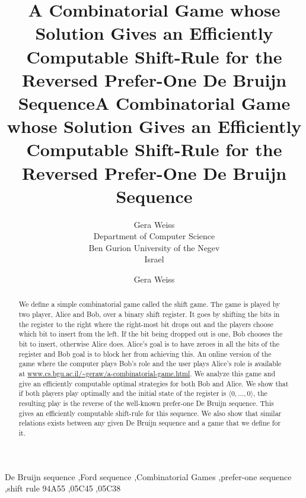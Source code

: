 \documentclass[final,12pt]{elsarticle}
\title{A Combinatorial Game whose Solution Gives an Efficiently Computable Shift-Rule for the Reversed Prefer-One De Bruijn Sequence}
\author{Gera Weiss\\ Department of Computer Science \\ Ben Gurion University of the Negev\\ Israel }
\theoremstyle{definition} \newtheorem{definition}[theorem]{Definition} \newtheorem{observation}[theorem]{Observation} \newtheorem{example}[theorem]{Example} \newtheorem{remark}[theorem]{Remark} \newtheorem{corrolary}[theorem]{Corrolary}
\newcommand{\T}[1]{\langle{#1}\rangle} \DeclareMathOperator{\drop}{drop} \DeclareMathOperator{\dropbits}{drop\_bits} \DeclareMathOperator{\dropstates}{drop\_states} \DeclareMathOperator{\leadingForm}{LeadingForm} \DeclareMathOperator{\dv}{div} %
\begin{document}


\sloppy
{}
\begin{frontmatter}
	
	\title{A Combinatorial Game whose Solution Gives an Efficiently Computable Shift-Rule for the Reversed Prefer-One De Bruijn Sequence} %
	
	
	\author[cs]{Gera Weiss}
	
	\address[cs]{Department of Computer Science, Ben-Gurion University of The Negev} 
	
	\begin{abstract}
		We define a simple combinatorial game called the shift game. The game is played by two player, Alice and Bob, over a binary shift register. It goes by shifting the bits in the register to the right where the right-most bit drops out and the players choose which bit to insert from the left. If the bit being dropped out is one, Bob chooses the bit to insert, otherwise Alice does. Alice's goal is to have zeroes in all the bits of the register and Bob goal is to block her from achieving this. An online version of the game where the computer plays Bob's role and the user plays Alice's role is available at \url{www.cs.bgu.ac.il/~geraw/a-combinatorial-game.html}. We analyze this game and give an efficiently computable optimal strategies for both Bob and Alice. We show that if both players play optimally and the initial state of the register is $\T{0,\dots,0}$, the resulting play is the reverse of the well-known prefer-one De Bruijn sequence. This gives an efficiently computable shift-rule for this sequence. We also show that similar relations exists between any given De Bruijn sequence and a game that we define for it.  
	\end{abstract}

	\begin{keyword}
		De Bruijn sequence \sep Ford sequence \sep Combinatorial Games \sep prefer-one sequence \sep shift rule
		\MSC[2010] 94A55 \sep 05C45 \sep 05C38
	\end{keyword}
	
\end{frontmatter}
\end{document}
